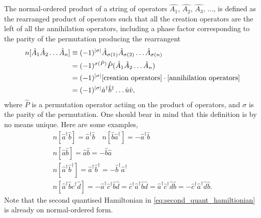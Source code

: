         The normal-ordered product of a string of operators $\hat{A_1}$, $\hat{A_2}$,
        $\hat{A_3}$, $\dots$, is defined as the rearranged product of operators such 
        that all the creation operators are the left of all the annihilation
        operators, including a phase factor corresponding to the parity of the
        permutation producing the rearrangent
        \begin{equation} 
            \begin{aligned}
            n[\hat{A}_1\hat{A}_2 \dots \hat{A}_n ]
            &\equiv (-1)^{\abs{\sigma}}
                \hat{A}_{\sigma(1)}\hat{A}_{\sigma(2)} \dots \hat{A}_{\sigma(n)} \\
            &= (-1)^{\sigma(\hat{P})}\hat{P}(\hat{A}_1\hat{A}_2 \dots \hat{A}_n) \\
            &= (-1)^{\abs{\sigma}}
            [\text{creation operators}] \cdot [\text{annihilation operators}] \\
            &= (-1)^{\abs{\sigma}}\hat{a}^\dagger \hat{b}^\dagger \dots \hat{u} \hat{v},
            \end{aligned}
        \end{equation}
        where $\hat{P}$ is a permutation operator actiing on the product of operators, 
        and $\sigma$ is the parity of the permutation. One should bear in mind that this 
        definition is by no means unique. Here are some examples,
        \begin{gather*}
            n[\hat{a}^\dagger \hat{b}] = \hat{a}^\dagger \hat{b} \quad
            n[\hat{b} \hat{a}^\dagger] = -\hat{a}^\dagger \hat{b} \\
            n[\hat{a} \hat{b} ] = \hat{a} \hat{b} = - \hat{b} \hat{a} \\
            n[\hat{a}^\dagger\hat{b}^\dagger ]
                = \hat{a}^\dagger \hat{b}^\dagger 
                = -\hat{b}^\dagger \hat{a}^\dagger \\
            n[\hat{a}^\dagger \hat{b} \hat{c}^\dagger \hat{d}]
                = -\hat{a}^\dagger \hat{c}^\dagger\hat{b} \hat{d} 
                = \hat{c}^\dagger \hat{a}^\dagger\hat{b} \hat{d} 
                = \hat{a}^\dagger \hat{c}^\dagger\hat{d} \hat{b} 
                = -\hat{c}^\dagger \hat{a}^\dagger\hat{d} \hat{b}.
        \end{gather*}
        Note that the second quantised Hamiltonian in \autoref{eq:second_quant_hamiltionian}
        is already on normal-ordered form.

